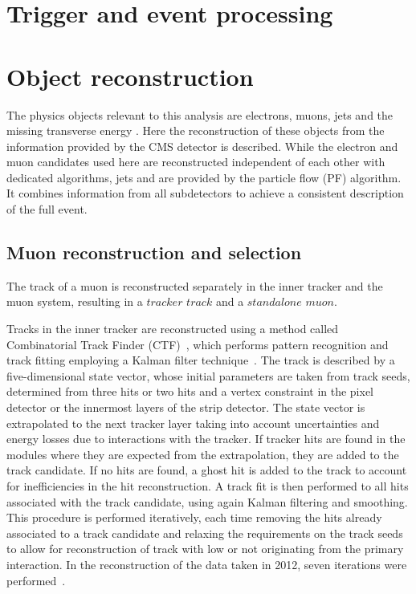 \section{Trigger and event processing}
\section{Object reconstruction}
The physics objects relevant to this analysis are electrons, muons, jets and the missing transverse energy \MET. Here the reconstruction of these objects from the information provided by the CMS detector is described. While the electron and muon candidates used here are reconstructed independent of each other with dedicated algorithms, jets and \MET are provided by the particle flow (PF) algorithm. It combines information from all subdetectors to achieve a consistent description of the full event. 
\subsection{Muon reconstruction and selection}
The track of a muon is reconstructed separately in the inner tracker and the muon system, resulting in a $\textit{tracker track}$ and a $\textit{standalone muon}$. 

Tracks in the inner tracker are reconstructed using a method called Combinatorial Track Finder (CTF)~\cite{Chatrchyan:2014fea}, which performs pattern recognition and track fitting employing a Kalman filter technique~\cite{Fruhwirth1987444}. The track is described by a five-dimensional state vector, whose initial parameters are taken from track seeds, determined from three hits or two hits and a vertex constraint in the pixel detector or the innermost layers of the strip detector. The state vector is extrapolated to the next tracker layer taking into account uncertainties and energy losses due to interactions with the tracker. If tracker hits are found in the modules where they are expected from the extrapolation, they are added to the track candidate. If no hits are found, a ghost hit is added to the track to account for inefficiencies in the hit reconstruction. A track fit is then performed to all hits associated with the track candidate, using again Kalman filtering and smoothing. This procedure is performed iteratively, each time removing the hits already associated to a track candidate and relaxing the requirements on the track seeds to allow for reconstruction of track with low \pt or not originating from the primary interaction. In the reconstruction of the data taken in 2012, seven iterations were performed~\cite{SWGuideIterativeTracking}. 

